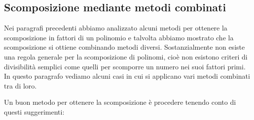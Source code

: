 \subsection{Scomposizione mediante metodi combinati}
\label{subsec:divpol_metodicombinati}

Nei paragrafi precedenti abbiamo analizzato alcuni metodi per ottenere
la scomposizione in fattori di un polinomio e talvolta abbiamo mostrato
che la scomposizione si ottiene combinando metodi diversi.
Sostanzialmente non esiste una regola generale per la scomposizione di
polinomi, cioè non esistono criteri di divisibilità semplici come
quelli per scomporre un numero nei suoi fattori primi. In questo
paragrafo vediamo alcuni casi in cui si applicano vari metodi combinati
tra di loro.

Un buon metodo per ottenere la scomposizione è procedere tenendo conto
di questi suggerimenti:


